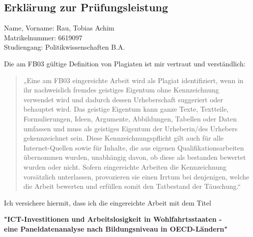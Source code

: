 \newpage


\subsection{Erklärung zur Prüfungsleistung}

{\footnotesize

    Name, Vorname: Rau, Tobias Achim \\
    Matrikelnummer: 6619097 \\
    Studiengang: Politikwissenschaften B.A.

    \vspace{0.5cm}

    Die am FB03 gültige Definition von Plagiaten ist mir vertraut und verständlich: 

    \begin{quote}
        „Eine am FB03 eingereichte Arbeit wird als Plagiat identifiziert, wenn in ihr nachweislich 
        fremdes geistiges Eigentum ohne Kennzeichnung verwendet wird und dadurch dessen Urheberschaft 
        suggeriert oder behauptet wird. Das geistige Eigentum kann ganze Texte, Textteile, 
        Formulierungen, Ideen, Argumente, Abbildungen, Tabellen oder Daten umfassen und muss als 
        geistiges Eigentum der Urheberin/des Urhebers gekennzeichnet sein. Diese 
        Kennzeichnungspflicht gilt auch für alle Internet-Quellen sowie für Inhalte, die aus eigenen 
        Qualifikationsarbeiten übernommen wurden, unabhängig davon, ob diese als bestanden bewertet 
        wurden oder nicht. Sofern eingereichte Arbeiten die Kennzeichnung vorsätzlich unterlassen, 
        provozieren sie einen Irrtum bei denjenigen, welche die Arbeit bewerten und erfüllen somit 
        den Tatbestand der Täuschung.“  
    \end{quote}

    Ich versichere hiermit, dass ich die eingereichte Arbeit mit dem Titel 

    \begin{center}
        \textbf{"\ac{ICT}-Investitionen und Arbeitslosigkeit in Wohlfahrtsstaaten - \\ 
        eine Paneldatenanalyse nach Bildungsniveau in OECD-Ländern"} \\ 
    \end{center}

}
